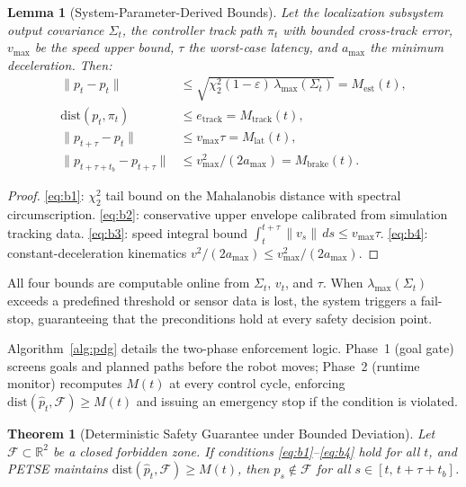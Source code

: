 \documentclass[journal,twoside,web]{ieeecolor}
\newtheorem{lemma}{Lemma}
\newtheorem{theorem}{Theorem}
\begin{document}
\begin{lemma}[System-Parameter-Derived Bounds]\label{lem:bounds}
Let the localization subsystem output covariance $\Sigma_t$, the controller track path $\pi_t$ with bounded cross-track error, $v_{\max}$ be the speed upper bound, $\tau$ the worst-case latency, and $a_{\max}$ the minimum deceleration. Then:
\begin{align}
\|p_t - \hat{p}_t\| &\le \sqrt{\chi^2_2(1{-}\varepsilon)\,\lambda_{\max}(\Sigma_t)} = M_{\mathrm{est}}(t), \label{eq:b1}\\
\mathrm{dist}(p_t, \pi_t) &\le e_{\mathrm{track}} = M_{\mathrm{track}}(t), \label{eq:b2}\\
\|p_{t+\tau} - p_t\| &\le v_{\max}\tau = M_{\mathrm{lat}}(t), \label{eq:b3}\\
\|p_{t+\tau+t_b} - p_{t+\tau}\| &\le v_{\max}^2/(2a_{\max}) = M_{\mathrm{brake}}(t). \label{eq:b4}
\end{align}
\end{lemma}
\begin{proof}
\eqref{eq:b1}: $\chi^2_2$ tail bound on the Mahalanobis distance with spectral circumscription. \eqref{eq:b2}: conservative upper envelope calibrated from simulation tracking data. \eqref{eq:b3}: speed integral bound $\int_t^{t+\tau}\|v_s\|\,ds \le v_{\max}\tau$. \eqref{eq:b4}: constant-deceleration kinematics $v^2/(2a_{\max}) \le v_{\max}^2/(2a_{\max})$.
\end{proof}

All four bounds are computable online from $\Sigma_t$, $v_t$, and $\tau$. When $\lambda_{\max}(\Sigma_t)$ exceeds a predefined threshold or sensor data is lost, the system triggers a fail-stop, guaranteeing that the preconditions hold at every safety decision point.

Algorithm~\ref{alg:pdg} details the two-phase enforcement logic. Phase~1 (goal gate) screens goals and planned paths before the robot moves; Phase~2 (runtime monitor) recomputes $M(t)$ at every control cycle, enforcing $\mathrm{dist}(\hat{p}_t, \mathcal{F}) \ge M(t)$ and issuing an emergency stop if the condition is violated.

\begin{theorem}[Deterministic Safety Guarantee under Bounded Deviation]
Let $\mathcal{F}\subset\mathbb{R}^2$ be a closed forbidden zone. If conditions \eqref{eq:b1}--\eqref{eq:b4} hold for all $t$, and PETSE maintains $\mathrm{dist}(\hat{p}_t, \mathcal{F}) \ge M(t)$, then $p_s \notin \mathcal{F}$ for all $s \in [t,\, t{+}\tau{+}t_b]$.
\end{theorem}
\end{document}
